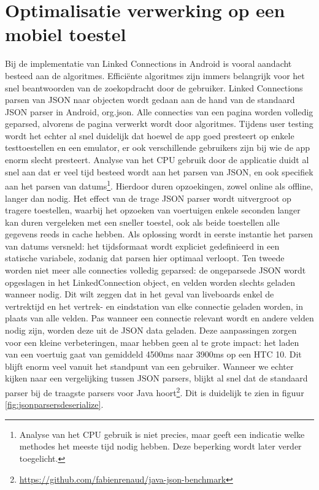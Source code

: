 \section{Optimalisatie verwerking op een mobiel toestel}
Bij de implementatie van Linked Connections in Android is vooral aandacht besteed aan de algoritmes. Efficiënte algoritmes zijn immers belangrijk voor het snel beantwoorden van de zoekopdracht door de gebruiker. Linked Connections parsen van JSON naar objecten wordt gedaan aan de hand van de standaard JSON parser in Android, org.json. Alle connecties van een pagina worden volledig geparsed, alvorens de pagina verwerkt wordt door algoritmes. Tijdens user testing wordt het echter al snel duidelijk dat hoewel de app goed presteert op enkele testtoestellen en een emulator, er ook verschillende gebruikers zijn bij wie de app enorm slecht presteert. Analyse van het CPU gebruik door de applicatie duidt al snel aan dat er veel tijd besteed wordt aan het parsen van JSON, en ook specifiek aan het parsen van datums\footnote{Analyse van het CPU gebruik is niet precies, maar geeft een indicatie welke methodes het meeste tijd nodig hebben. Deze beperking wordt later verder toegelicht.}. Hierdoor duren opzoekingen, zowel online als offline, langer dan nodig. Het effect van de trage JSON parser wordt uitvergroot op tragere toestellen, waarbij het opzoeken van voertuigen enkele seconden langer kan duren vergeleken met een sneller toestel, ook als beide toestellen alle gegevens reeds in cache hebben. Als oplossing wordt in eerste instantie het parsen van datums versneld: het tijdsformaat wordt expliciet gedefinieerd in een statische variabele, zodanig dat parsen hier optimaal verloopt. Ten tweede worden niet meer alle connecties volledig geparsed: de ongeparsede JSON wordt opgeslagen in het LinkedConnection object, en velden worden slechts geladen wanneer nodig. Dit wilt zeggen dat in het geval van liveboards enkel de vertrektijd en het vertrek- en eindstation van elke connectie geladen worden, in plaats van alle velden. Pas wanneer een connectie relevant wordt en andere velden nodig zijn, worden deze uit de JSON data geladen.
Deze aanpassingen zorgen voor een kleine verbeteringen, maar hebben geen al te grote impact: het laden van een voertuig gaat van gemiddeld 4500ms naar 3900ms op een HTC 10. Dit blijft enorm veel vanuit het standpunt van een gebruiker.
Wanneer we echter kijken naar een vergelijking tussen JSON parsers, blijkt al snel dat de standaard  parser bij de traagste parsers voor Java hoort\footnote{\url{https://github.com/fabienrenaud/java-json-benchmark}}. Dit is duidelijk te zien in figuur \ref{fig:jsonparsersdeserialize}.

